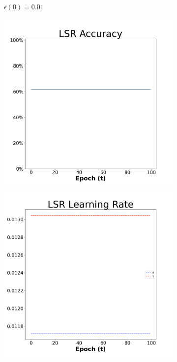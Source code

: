 \begin{figure}[H]
\begin{subfigure}{0.3\textwidth}
  \caption{$\epsilon(0)=0.01$}
\end{subfigure}\hfil %
\begin{subfigure}{0.3\textwidth}
  \includegraphics[width=\linewidth]{images/exper1/SP/LSR_0.03_acc.png}
  \includegraphics[width=\linewidth]{images/exper1/SP/LSR_0.03_lr.png}

\end{subfigure}
\end{figure}
